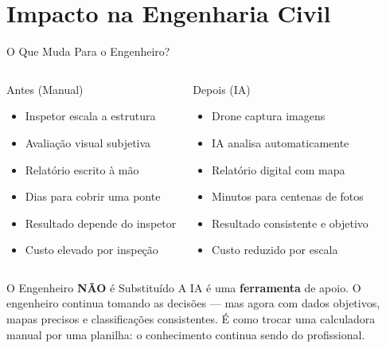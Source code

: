 \documentclass[aspectratio=169, 12pt]{beamer}
\begin{document}
\section{Impacto na Engenharia Civil}

\begin{frame}{O Que Muda Para o Engenheiro?}
    \begin{columns}[T]
        \begin{alertblock}{\faTimesCircle\hspace{0.2cm} Antes (Manual)}
            \begin{itemize}
                \item Inspetor escala a estrutura
                \item Avaliação visual subjetiva
                \item Relatório escrito à mão
                \item Dias para cobrir uma ponte
                \item Resultado depende do inspetor
                \item Custo elevado por inspeção
            \end{itemize}
        \end{alertblock}

        \begin{exampleblock}{\faCheckCircle\hspace{0.2cm} Depois (IA)}
            \begin{itemize}
                \item Drone captura imagens
                \item IA analisa automaticamente
                \item Relatório digital com mapa
                \item Minutos para centenas de fotos
                \item Resultado consistente e objetivo
                \item Custo reduzido por escala
            \end{itemize}
        \end{exampleblock}
    \end{columns}

    \vspace{0.5cm}

    \begin{block}{O Engenheiro \textbf{NÃO} é Substituído}
        A IA é uma \textbf{ferramenta} de apoio. O engenheiro continua tomando as decisões --- mas agora com dados objetivos, mapas precisos e classificações consistentes. É como trocar uma calculadora manual por uma planilha: o conhecimento continua sendo do profissional.
    \end{block}
\end{frame}
\end{document}

